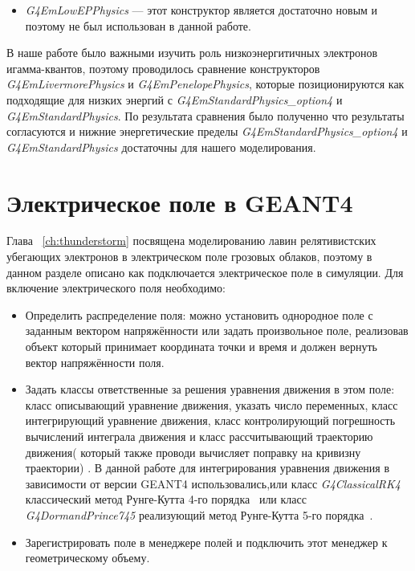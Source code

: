 \begin{itemize}
    \item \textit{G4EmLowEPPhysics} --- этот конструктор является достаточно новым и поэтому не был использован в данной работе.
\end{itemize}
В наше работе  было важными изучить роль низкоэнергитичных электронов игамма-квантов, поэтому проводилось сравнение конструкторов  \textit{G4EmLivermorePhysics} и \textit{G4EmPenelopePhysics}, которые позиционируются как подходящие для низких энергий с \textit{G4EmStandardPhysics\_option4} и \textit{G4EmStandardPhysics}. По результата сравнения было полученно что результаты согласуются и нижние энергетические пределы  \textit{G4EmStandardPhysics\_option4} и \textit{G4EmStandardPhysics}  достаточны для нашего моделирования.

\section{Электрическое поле в GEANT4 }\label{sec:theory/efield}
Глава ~\ref{ch:thunderstorm} посвящена моделированию лавин релятивистских убегающих электронов в электрическом поле грозовых облаков, поэтому в данном разделе описано как подключается электрическое поле в симуляции. Для включение электрического поля необходимо: 
\begin{itemize}
    \item Определить распределение поля: можно установить однородное поле с заданным вектором напряжённости или задать произвольное поле, реализовав объект который принимает координата точки и время и должен вернуть вектор напряжённости поля.
    \item Задать классы ответственные за решения уравнения движения в этом поле: класс описывающий уравнение движения, указать число переменных, класс интегрирующий уравнение движения, класс контролирующий погрешность вычислений интеграла движения и класс рассчитывающий траекторию движения( который также проводи вычисляет поправку на кривизну траектории) . В данной работе для интегрирования уравнения движения в зависимости от версии GEANT4 использовались,или класс \textit{G4ClassicalRK4} классический метод Рунге-Кутта 4-го порядка~\cite{fedorenko1994} или класс \textit{G4DormandPrince745} реализующий метод Рунге-Кутта 5-го порядка~\cite{dormand1980family}. 
    \item Зарегистрировать поле в менеджере полей и подключить этот менеджер к геометрическому объему.
\end{itemize}

